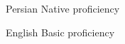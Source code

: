 
\begin{cvskills}
\cvskill
{Persian} %
{Native proficiency} %

\cvskill
{English} %
{Basic proficiency} %

\end{cvskills}
